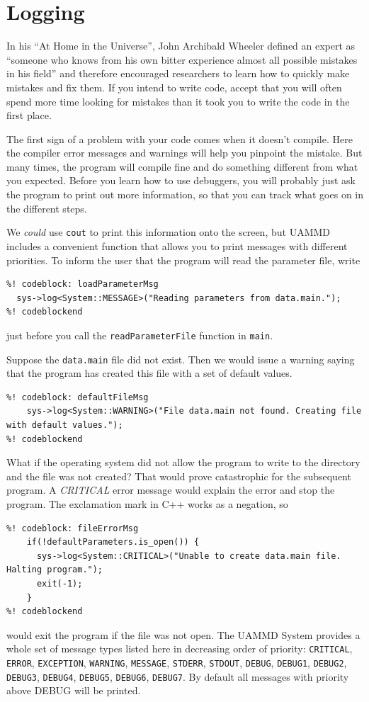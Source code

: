 \section{Logging}

In his ``At Home in the Universe'', John Archibald Wheeler defined an expert as
``someone who knows from his own bitter experience almost all possible mistakes
in his field'' and therefore encouraged researchers to learn how to quickly make
mistakes and fix them. If you intend to write code, accept that you will often
spend more time looking for mistakes than it took you to write the code in the
first place.

The first sign of a problem with your code comes when it doesn't compile. Here 
the compiler error messages and	warnings will help you pinpoint	the mistake. But 
many times, the program will compile fine and do something different from what 
you expected. Before you learn how to use debuggers, you will probably just ask 
the program to print out more information, so that you can track what goes on in 
the different steps.

We \textit{could} use \texttt{cout} to print this information onto the screen, 
but UAMMD includes a convenient function that allows you to print messages with 
different priorities. To inform the user that the program will read the 
parameter file, write
\begin{lstlisting}
%! codeblock: loadParameterMsg
  sys->log<System::MESSAGE>("Reading parameters from data.main.");
%! codeblockend
\end{lstlisting}
just before you call the \texttt{readParameterFile} function in \texttt{main}.

Suppose the \texttt{data.main} file did not exist. Then we would issue a warning
saying that the program has created this file with a set of default values.
\begin{lstlisting}
%! codeblock: defaultFileMsg
    sys->log<System::WARNING>("File data.main not found. Creating file with default values.");
%! codeblockend
\end{lstlisting}
What if the operating system did not allow the program to write to the directory
and the file was not created? That would prove catastrophic for the subsequent
program. A \textit{CRITICAL} error message would explain the error and stop the
program. The exclamation mark in C++ works as a negation, so
\begin{lstlisting}
%! codeblock: fileErrorMsg
    if(!defaultParameters.is_open()) {
      sys->log<System::CRITICAL>("Unable to create data.main file. Halting program.");
      exit(-1);
    }
%! codeblockend
\end{lstlisting}
would exit the program if the file was not open. The UAMMD System provides a
whole set of message types listed here in decreasing order of priority:
\texttt{CRITICAL}, \texttt{ERROR}, \texttt{EXCEPTION}, \texttt{WARNING},
\texttt{MESSAGE}, \texttt{STDERR}, \texttt{STDOUT}, \texttt{DEBUG},
\texttt{DEBUG1}, \texttt{DEBUG2}, \texttt{DEBUG3}, \texttt{DEBUG4},
\texttt{DEBUG5}, \texttt{DEBUG6}, \texttt{DEBUG7}. By default all messages
with priority above DEBUG will be printed.

